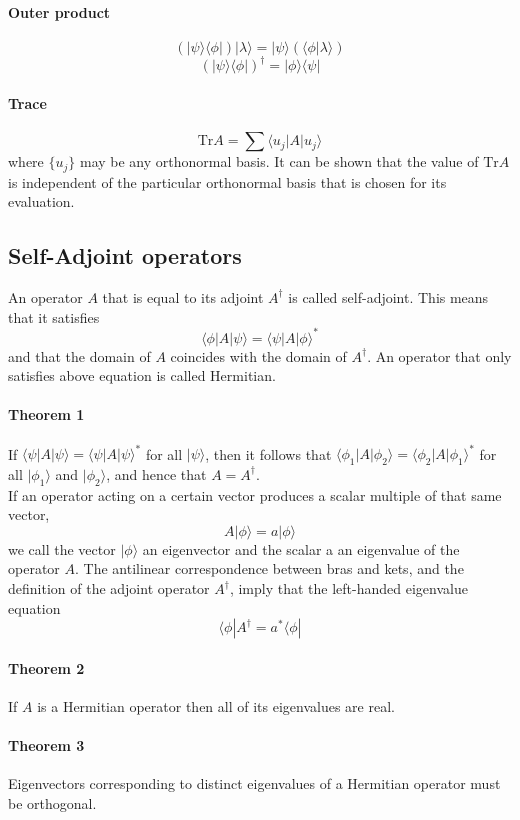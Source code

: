 \documentclass{article}
\begin{document}
\paragraph{Outer product}
\[(| \psi \rangle \langle \phi |) | \lambda \rangle = | \psi \rangle (\langle \phi | \lambda \rangle)\]
\[(| \psi \rangle \langle \phi |) ^ {\dagger} = | \phi \rangle \langle \psi |\]
\paragraph{Trace}
\[ \mathrm{Tr} A = \sum \langle u_j | A | u_j \rangle \]
where $\{ u_j \}$ may be any orthonormal basis. It can be shown that the value of $\mathrm{Tr}A$ is independent of the particular orthonormal basis that is chosen for its evaluation.

\subsection{Self-Adjoint operators}
An operator $A$ that is equal to its adjoint $A^{\dagger}$ is called self-adjoint. This means that it satisfies
\[\langle \phi | A | \psi \rangle  = \langle \psi | A | \phi \rangle^*\]
and that the domain of $A$ coincides with the domain of $A^{\dagger}$. An operator that only satisfies above equation is called Hermitian.
\paragraph{Theorem 1} If $\langle \psi | A | \psi \rangle  = \langle \psi | A | \psi \rangle^*$ for all $| \psi \rangle$, then it follows that $\langle \phi_1 | A | \phi_2 \rangle  = \langle \phi_2 | A | \phi_1 \rangle^*$ for all $|\phi_1\rangle$ and $|\phi_2\rangle$, and hence that $A = A^{\dagger}$.\\
If an operator acting on a certain vector produces a scalar multiple of that same vector,
\[ A |\phi \rangle = a |\phi \rangle\]
we call the vector $| \phi \rangle$ an eigenvector and the scalar a an eigenvalue of the operator $A$. The antilinear correspondence between bras and kets, and the definition of the adjoint operator $A^{\dagger}$, imply that the left-handed eigenvalue equation
\[\langle \phi | A^{\dagger} = a^{*} \langle \phi |\]
\paragraph{Theorem 2} If $A$ is a Hermitian operator then all of its eigenvalues are real.
\paragraph{Theorem 3} Eigenvectors corresponding to distinct eigenvalues of a Hermitian operator must be orthogonal.
\end{document}
